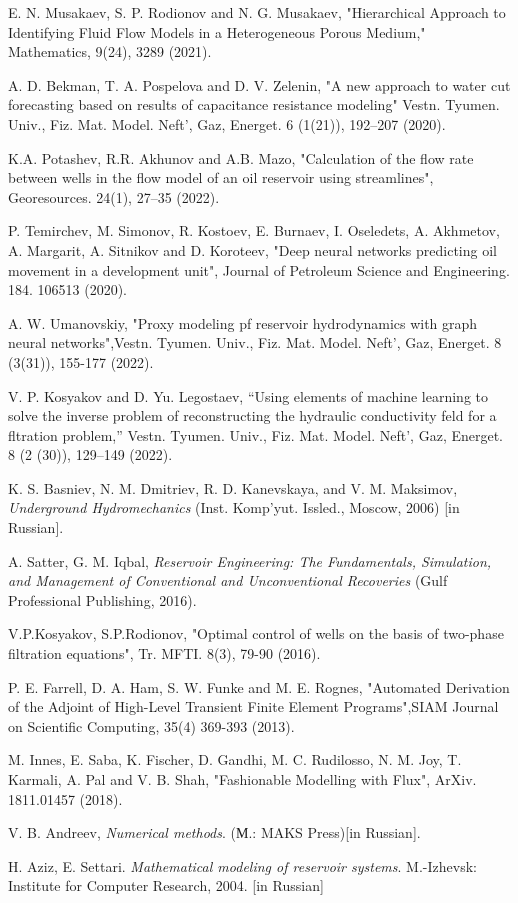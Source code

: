 \documentclass{article}
\begin{document}
 \begin{thebibliography}{20}
	
 E. N. Musakaev, S. P. Rodionov and N. G. Musakaev, "Hierarchical Approach to Identifying Fluid Flow Models in a Heterogeneous Porous Medium," Mathematics, 9(24), 3289 (2021).

 A. D. Bekman, T. A. Pospelova and D. V. Zelenin,  "A new approach to water cut forecasting based on results of capacitance resistance modeling" Vestn. Tyumen. Univ., Fiz. Mat. Model. Neft’, Gaz, Energet. 6 (1(21)), 192–207 (2020).

 K.A. Potashev, R.R. Akhunov and  A.B. Mazo, "Calculation of the flow rate between wells in the flow model of an oil reservoir using streamlines", Georesources. 24(1), 27–35 (2022).

  P. Temirchev, M. Simonov, R. Kostoev, E. Burnaev, I. Oseledets, A. Akhmetov, A. Margarit, A. Sitnikov and D. Koroteev, "Deep neural networks predicting oil movement in a development unit", Journal of Petroleum Science and Engineering. 184. 106513 (2020).

 A. W. Umanovskiy, "Proxy modeling pf reservoir hydrodynamics with graph neural networks",Vestn. Tyumen. Univ., Fiz. Mat. Model. Neft’, Gaz, Energet. 8 (3(31)), 155-177 (2022).

 V. P. Kosyakov and D. Yu. Legostaev, “Using elements of machine learning to solve the inverse problem of reconstructing the hydraulic conductivity feld for a fltration problem,” Vestn. Tyumen. Univ., Fiz. Mat. Model. Neft’, Gaz, Energet. 8 (2 (30)), 129–149 (2022).

K. S. Basniev, N. M. Dmitriev, R. D. Kanevskaya, and V. M. Maksimov, \textit{Underground Hydromechanics} (Inst. Komp'yut. Issled., Moscow, 2006) [in Russian].

A. Satter, G. M. Iqbal, \textit{Reservoir Engineering: The Fundamentals, Simulation, and Management of Conventional and Unconventional Recoveries} (Gulf Professional Publishing, 2016).

 V.P.Kosyakov, S.P.Rodionov, "Optimal control of wells on the basis of two-phase filtration equations",  Tr. MFTI. 8(3), 79-90 (2016).

 P. E. Farrell, D. A. Ham, S. W. Funke and M. E. Rognes, "Automated Derivation of the Adjoint of High-Level Transient Finite Element Programs",SIAM Journal on Scientific Computing, 35(4) 369-393 (2013).

  M. Innes, E. Saba, K. Fischer, D. Gandhi, M. C. Rudilosso, N. M. Joy, T. Karmali, A. Pal and V. B. Shah, "Fashionable Modelling with Flux", ArXiv. 1811.01457 (2018).

 V. B. Andreev, \textit{Numerical methods}. (М.: MAKS Press)[in Russian].

 H. Aziz, E. Settari. \textit{Mathematical modeling of reservoir systems}.  M.-Izhevsk: Institute for Computer Research, 2004. [in Russian]


\end{thebibliography}
\end{document}

